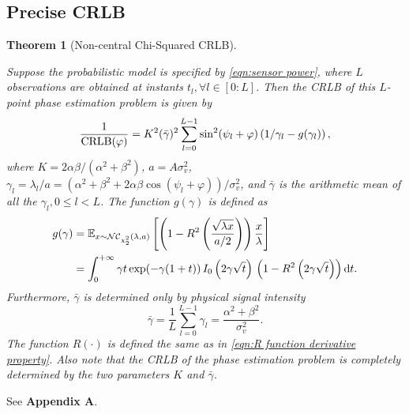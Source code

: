 \documentclass[12pt,draftclsnofoot,journal,onecolumn]{IEEEtran}
\newtheorem{theorem}{\bf Theorem}
\theoremstyle{nonumberplain}
\def \exp {\text{exp}}
\def \nc {\mathcal{NC}}
\begin{document}
\subsection{Precise CRLB}
    \begin{theorem}[Non-central Chi-Squared CRLB] \label{thm:precise CRLB}\mbox{}\par
        Suppose the probabilistic model is specified by \eqref{eqn:sensor power}, where $L$ observations are obtained at instants $t_l, \forall l\in[0:L]$. Then the CRLB of this $L$-point phase estimation problem is given by
        \begin{equation}
            \frac{1}{{\rm CRLB}(\varphi)} = K^2(\bar{\gamma})^2 \sum_{l=0}^{L-1}\sin^2(\psi_l+\varphi)\left(1/\gamma_l-g(\gamma_l)\right),
            \label{eqn:precise_CRLB}
        \end{equation}
        where $K=2\alpha\beta/(\alpha^2+\beta^2)$, $a=A\sigma_v^2$, $\gamma_l=\lambda_l/a=\left(\alpha^2+\beta^2+2\alpha\beta \cos(\psi_l+\varphi)\right)/\sigma_v^2$, and $\bar{\gamma}$ is the arithmetic mean of all the $\gamma_l, 0\leq l<L$. The function $g(\gamma)$ is defined as 
        \begin{equation}
            \begin{aligned}
                g(\gamma) &= \mathbb{E}_{x\sim \nc_{\chi_2^2}(\lambda, a)}\left[\left(1-R^2\left(\frac{\sqrt{\lambda x}}{a/2}\right)\right)\frac{x}{\lambda}\right] \\
                & = \int_{0}^{+\infty}\gamma t \, \exp(-\gamma(1+t))\, I_0\left(2\gamma\sqrt{t}\right)\,\left(1-R^2\left(2\gamma\sqrt{t}\right)\right){\rm d}t.
            \end{aligned}
            \label{eqn:precise_g_function}
        \end{equation}
        Furthermore, $\bar{\gamma}$ is determined only by physical signal intensity
        \begin{equation}
            \bar{\gamma} = \frac{1}{L}\sum_{l=0}^{L-1}{\gamma_l} = \frac{\alpha^2+\beta^2}{\sigma_v^2}.
        \end{equation}
        The function $R(\cdot)$ is defined the same as in \eqref{eqn:R function derivative property}. Also note that the CRLB of the phase estimation problem is completely determined by the two parameters $K$ and $\bar{\gamma}$. 
    \end{theorem}
    \begin{IEEEproof}
        See {\bf Appendix A}. 
    \end{IEEEproof}
\end{document}
